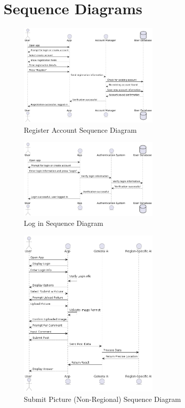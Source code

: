 \documentclass[]{article}
\begin{document}
\section{Sequence Diagrams}
\label{sec:sequence_diagrams}
\begin{figure}[H]
    \centering
    \includegraphics[width=0.6\textwidth]{out/sequence1/sequence1.png} %
    \caption{Register Account Sequence Diagram}
\end{figure}

\begin{figure}[H]
    \centering
    \includegraphics[width=0.6\textwidth]{out/sequence2/sequence2.png} %
    \caption{Log in Sequence Diagram}
\end{figure}


\begin{figure}[H]
    \centering
    \includegraphics[width=0.6\textwidth]{out/sequence3/sequence3.png} %
    \caption{Submit Picture (Non-Regional) Sequence Diagram}
\end{figure}
\end{document}
